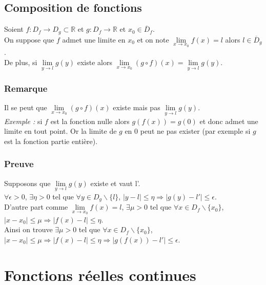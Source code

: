 \documentclass[a4paper,10pt]{book} %
\newcommand{\R}{\mathbb{R}}
\begin{document}
\subsection{Composition de fonctions}
Soient $f: D_{f}\rightarrow D_{g}\subset\R$ et $g:D_{f}\rightarrow \R$ et $x_{0}\in \overline{D}_{f}$.\\

On suppose que $f$ admet une limite en $x_{0}$ et on note $\lim\limits_{x\rightarrow x_{0}}f(x)=l$ alors $l\in \overline{D}_{g}$.\\

De plus, si $\lim\limits_{y\rightarrow l} g(y)$ existe alors $\lim\limits_{x\rightarrow x_{0}} (g\circ f)(x)=\lim\limits_{y\rightarrow l} g(y)$.

\subsubsection{Remarque}
Il se peut que $\lim\limits_{x\rightarrow x_{0}} (g\circ f)(x)$ existe mais pas $\lim\limits_{y\rightarrow l} g(y)$.\\

\emph{Exemple :} si $f$ est la fonction nulle alors $g(f(x))=g(0)$ et donc admet une limite en tout point. Or la limite de $g$ en 0 peut ne pas exister (par exemple si $g$ est la fonction partie entière).

\subsubsection{Preuve}
Supposons que $\lim\limits_{y\rightarrow l} g(y)$ existe et vaut l'.\\
$\forall\epsilon>0$, $\exists\eta>0$ tel que $\forall y\in D_{g}\backslash\{l\}$, $|y-l|\leq \eta \Rightarrow | g(y)-l'|\leq \epsilon$.\\

D'autre part comme $\lim\limits_{x\rightarrow x_{0}} f(x)=l$, $\exists \mu>0$ tel que $\forall x\in D_{f}\backslash\{x_{0}\}$, $|x-x_{0}|\leq \mu \Rightarrow |f(x)-l|\leq \eta$.\\
Ainsi on trouve $\exists \mu>0$ tel que $\forall x\in D_{f}\backslash\{x_{0}\}$, $|x-x_{0}|\leq \mu \Rightarrow |f(x)-l|\leq \eta \Rightarrow |g(f(x))-l'|\leq \epsilon$.

\newpage

\section{Fonctions réelles continues}
\end{document}
